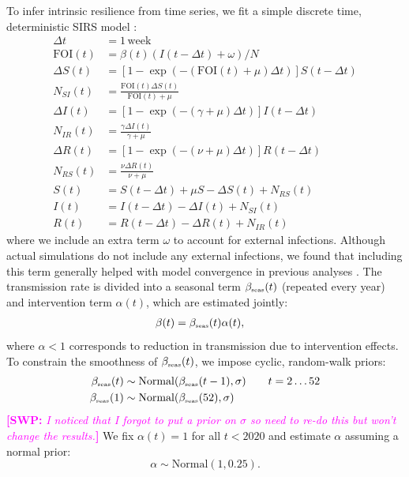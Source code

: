 \documentclass[12pt]{article}
\newcommand{\comment}{\showcomment}
\newcommand{\showcomment}[3]{\textcolor{#1}{\textbf{[#2: }\textsl{#3}\textbf{]}}}
\newcommand{\swp}[1]{\comment{magenta}{SWP}{#1}}
\newcommand{\tsub}[2]{#1_{{\textrm{\tiny #2}}}}
\begin{document}
To infer intrinsic resilience from time series, we fit a simple discrete time, deterministic SIRS model \citep{park2024predicting}:
\begin{align}
\Delta t &= 1\,\mathrm{week}\\
\textrm{FOI}(t) &= \beta(t) (I(t- \Delta t)+\omega)/N\\
\Delta S(t) &= \left[1- \exp(-(\textrm{FOI}(t) + \mu) \Delta t )\right] S(t-\Delta t)\\
N_{SI}(t) &= \frac{\textrm{FOI}(t)\Delta S(t)}{\textrm{FOI}(t) + \mu} \\
\Delta I(t) &= \left[1- \exp(-(\gamma + \mu) \Delta t )\right] I(t-\Delta t)\\
N_{IR}(t) &= \frac{\gamma \Delta I(t)}{\gamma + \mu} \\
\Delta R(t) &= \left[1- \exp(-(\nu + \mu) \Delta t )\right] R(t-\Delta t)\\
N_{RS}(t) &= \frac{\nu \Delta R(t)}{\nu + \mu} \\
S(t) &= S(t-\Delta t) + \mu S - \Delta S(t) + N_{RS}(t)  \\
I(t) &= I(t-\Delta t) - \Delta I(t) + N_{SI}(t)  \\
R(t) &= R(t-\Delta t) - \Delta R(t) + N_{IR}(t)
\end{align}
where we include an extra term $\omega$ to account for external infections.
Although actual simulations do not include any external infections, we found that including this term generally helped with model convergence in previous analyses \citep{park2024predicting}.
The transmission rate is divided into a seasonal term $\tsub{\beta}{seas}(t)$ (repeated every year) and intervention term $\alpha(t)$, which are estimated jointly:
\begin{align}
\beta(t) &= \tsub{\beta}{seas}(t) \alpha(t),
\end{align}
where $\alpha < 1$ corresponds to reduction in transmission due to intervention effects.
To constrain the smoothness of $\tsub{\beta}{seas}(t)$, we impose cyclic, random-walk priors:
\begin{align}
\tsub{\beta}{seas}(t) &\sim \mathrm{Normal}(\tsub{\beta}{seas}(t-1), \sigma) \qquad t = 2 \dots 52\\
\tsub{\beta}{seas}(1) &\sim \mathrm{Normal}(\tsub{\beta}{seas}(52), \sigma)
\end{align}
\swp{I noticed that I forgot to put a prior on $\sigma$ so need to re-do this but won't change the results.}
We fix $\alpha(t)=1$ for all $t < 2020$ and estimate $\alpha$ assuming a normal prior:
\begin{equation}
\alpha \sim \mathrm{Normal}(1, 0.25).
\end{equation}
\end{document}
